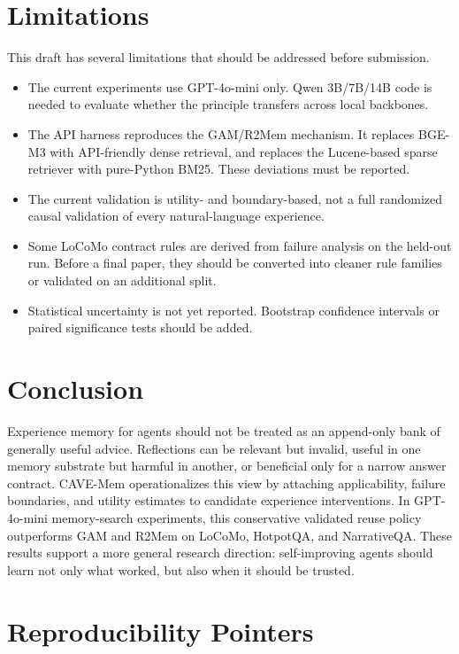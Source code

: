 \documentclass[11pt]{article}
\newcommand{\method}{CAVE-Mem}
\begin{document}
\section{Limitations}

This draft has several limitations that should be addressed before submission.

\begin{itemize}[leftmargin=*]
  \item The current experiments use GPT-4o-mini only. Qwen 3B/7B/14B code is
  needed to evaluate whether the principle transfers across local backbones.
  \item The API harness reproduces the GAM/R2Mem mechanism. It replaces
  BGE-M3 with API-friendly dense retrieval, and replaces the Lucene-based
  sparse retriever with pure-Python BM25.
  These deviations must be reported.
  \item The current validation is utility- and boundary-based, not a full
  randomized causal validation of every natural-language experience.
  \item Some LoCoMo contract rules are derived from failure analysis on the
  held-out run. Before a final paper, they should be converted into cleaner
  rule families or validated on an additional split.
  \item Statistical uncertainty is not yet reported. Bootstrap confidence
  intervals or paired significance tests should be added.
\end{itemize}

\section{Conclusion}

Experience memory for agents should not be treated as an append-only bank of
generally useful advice. Reflections can be relevant but invalid, useful in one
memory substrate but harmful in another, or beneficial only for a narrow answer
contract. \method{} operationalizes this view by attaching applicability,
failure boundaries, and utility estimates to candidate experience
interventions. In GPT-4o-mini memory-search experiments, this conservative
validated reuse policy outperforms GAM and R2Mem on LoCoMo, HotpotQA, and
NarrativeQA. These results support a more general research direction:
self-improving agents should learn not only what worked, but also when it
should be trusted.

\section*{Reproducibility Pointers}
\end{document}
